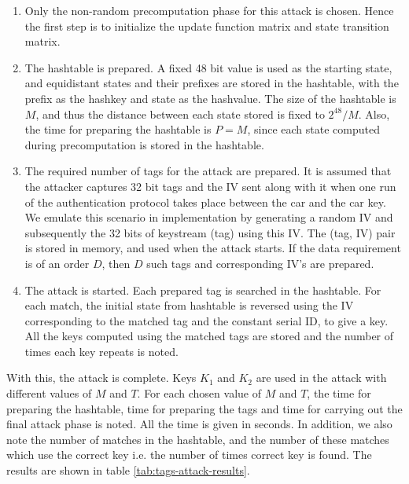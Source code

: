 \begin{enumerate}

\item Only the non-random precomputation phase for this attack is chosen. Hence the first step is to initialize the update function matrix and state transition matrix.
\item The hashtable is prepared. A fixed 48 bit value is used as the starting state, and equidistant states and their prefixes are stored in the hashtable, with the prefix as the hashkey and state as the hashvalue. The size of the hashtable is $M$, and thus the distance between each state stored is fixed to $2^{48}/M$. Also, the time for preparing the hashtable is $P = M$, since each state computed during precomputation is stored in the hashtable.  
\item The required number of tags for the attack are prepared. It is assumed that the attacker captures 32 bit tags and the IV sent along with it when one run of the authentication protocol takes place between the car and the car key. We emulate this scenario in implementation by generating a random IV and subsequently the 32 bits of keystream (tag) using this IV. The (tag, IV) pair is stored in memory, and used when the attack starts. If the data requirement is of an order $D$, then $D$ such tags and corresponding IV's are prepared. 
\item The attack is started. Each prepared tag is searched in the hashtable. For each match, the initial state from hashtable is reversed using the IV corresponding to the matched tag and the constant serial ID, to give a key. All the keys computed using the matched tags are stored and the number of times each key repeats is noted. 
\end{enumerate}

With this, the attack is complete. Keys $K_1$ and $K_2$ are used in the attack with different values of $M$ and $T$. For each chosen value of $M$ and $T$, the time for preparing the hashtable, time for preparing the tags and time for carrying out the final attack phase is noted. All the time is given in seconds. In addition, we also note the number of matches in the hashtable, and the number of these matches which use the correct key i.e. the number of times correct key is found. The results are shown in table \ref{tab:tags-attack-results}.

